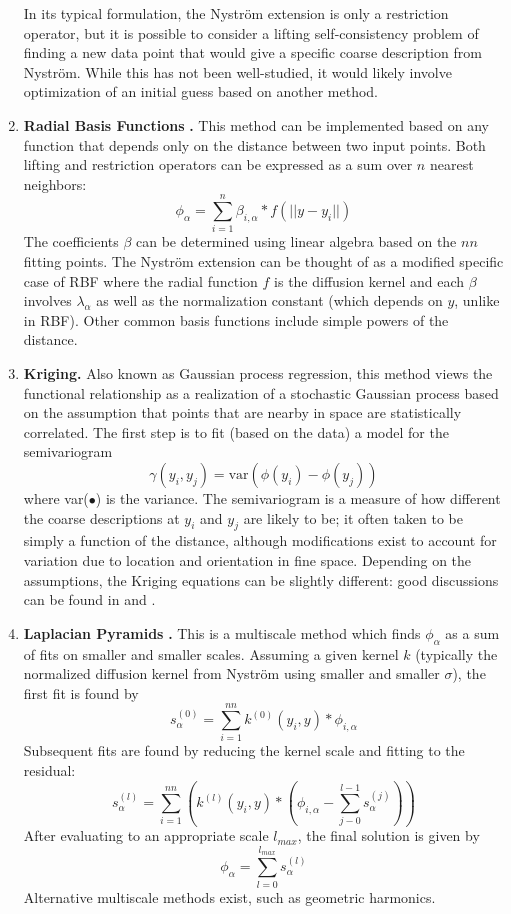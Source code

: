 \documentclass[12pt]{article}
\begin{document}
\begin{enumerate}
In its typical formulation, the Nystr\"om extension is only a restriction operator, but it is possible to consider a lifting self-consistency problem of finding a new data point that would give a specific coarse description from Nystr\"om. While this has not been well-studied, it would likely involve optimization of an initial guess based on another method.
\item \textbf{Radial Basis Functions }\cite{Press2007}\textbf{.}   This method can be implemented based on any function that depends only on the distance between two input points. Both lifting and restriction operators can be expressed as a sum over $n$ nearest neighbors:
\[
\phi_{\alpha} =\sum_{i=1}^{n} \beta_{i,\alpha}*f(||y-y_i||)
\]
The coefficients $\beta$ can be determined using linear algebra based on the $nn$ fitting points. The Nystr\"om extension can be thought of as a modified specific case of RBF where the radial function $f$ is the diffusion kernel and each $\beta$ involves $\lambda_\alpha$ as well as the normalization constant (which depends on $y$, unlike in RBF). Other common basis functions include simple powers of the distance.
\item \textbf{Kriging.} Also known as Gaussian process regression, this method views the functional relationship as a realization of a stochastic Gaussian process based on the assumption that points that are nearby in space are statistically correlated. The first step is to fit (based on the data) a model for the semivariogram
\[
\gamma(y_i,y_j)=\mathrm{var}(\phi(y_i)-\phi(y_j))
\]
where var($\bullet$) is the variance. The semivariogram is a measure of how different the coarse descriptions at $y_i$ and $y_j$ are likely to be; it often taken to be simply a function of the distance, although modifications exist to account for variation due to location and orientation in fine space. Depending on the assumptions, the Kriging equations can be slightly different: good discussions can be found in \cite{Press2007} and \cite{Isaaks1989}.
\item \textbf{Laplacian Pyramids }\cite{Dsilva2013, Rabin2012}\textbf{.}   This is a multiscale method which finds $\phi_\alpha$ as a sum of fits on smaller and smaller scales. Assuming a given kernel $k$ (typically the normalized diffusion kernel from Nystr\"om using smaller and smaller $\sigma$), the first fit is found by
\[
s^{(0)}_\alpha=\sum_{i=1}^{nn} k^{(0)}(y_i,y)*\phi_{i,\alpha}
\]
Subsequent fits are found by reducing the kernel scale and fitting to the residual:
\[
s^{(l)}_\alpha=\sum_{i=1}^{nn} \left( k^{(l)}(y_i,y)*(\phi_{i,\alpha}-\sum_{j-0}^{l-1}s^{(j)}_\alpha )\right)
\]
After evaluating to an appropriate scale $l_{max}$, the final solution is given by
\[
\phi_\alpha=\sum_{l=0}^{l_{max}}s^{(l)}_\alpha
\]
Alternative multiscale methods exist, such as geometric harmonics.
\end{enumerate}
\end{document}
